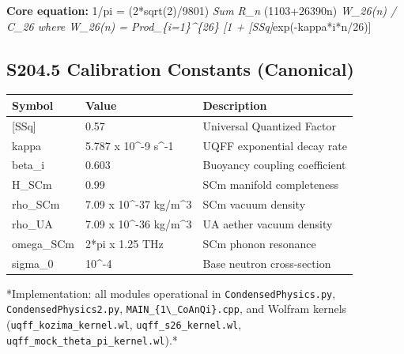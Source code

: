\documentclass[11pt]{article}
\begin{document}
\textbf{Core equation:} 1/pi = (2*sqrt(2)/9801) \emph{ Sum R\_n } (1103+26390n) \emph{ W\_26(n) / C\_26 where W\_26(n) = Prod\_\{i=1\}\textasciicircum{}\{26\} [1 + [SSq]}exp(-kappa*i*n/26)]

\subsection*{S204.5 Calibration Constants (Canonical)}

\begin{center}
\begin{longtable}{lll}
\toprule
Symbol & Value & Description \tabularnewline
\midrule
\endhead
{}[SSq] & 0.57 & Universal Quantized Factor \tabularnewline
kappa & 5.787 x 10\textasciicircum{}-9 s\textasciicircum{}-1 & UQFF exponential decay rate \tabularnewline
beta\_i & 0.603 & Buoyancy coupling coefficient \tabularnewline
H\_SCm & 0.99 & SCm manifold completeness \tabularnewline
rho\_SCm & 7.09 x 10\textasciicircum{}-37 kg/m\textasciicircum{}3 & SCm vacuum density \tabularnewline
rho\_UA & 7.09 x 10\textasciicircum{}-36 kg/m\textasciicircum{}3 & UA aether vacuum density \tabularnewline
omega\_SCm & 2*pi x 1.25 THz & SCm phonon resonance \tabularnewline
sigma\_0 & 10\textasciicircum{}-4 & Base neutron cross-section \tabularnewline
\bottomrule
\end{longtable}
\end{center}

*Implementation: all modules operational in \verb|CondensedPhysics.py|, \verb|CondensedPhysics2.py|, \verb|MAIN_{1\_CoAnQi}.cpp|, and Wolfram kernels (\verb|uqff_kozima_kernel.wl|, \verb|uqff_s26_kernel.wl|, \verb|uqff_mock_theta_pi_kernel.wl|).*


\end{document}
